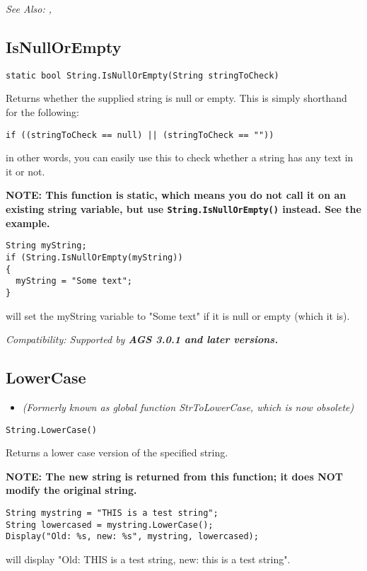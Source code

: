 \it{See Also:} ,


\subsection{IsNullOrEmpty}\label{String.IsNullOrEmpty}%

\begin{verbatim}
static bool String.IsNullOrEmpty(String stringToCheck)
\end{verbatim}
Returns whether the supplied string is null or empty. This is simply shorthand for the following:
\begin{verbatim}
if ((stringToCheck == null) || (stringToCheck == ""))
\end{verbatim}
in other words, you can easily use this to check whether a string has any text in it or not.

\bf{NOTE:} This function is static, which means you do not call it on an existing
string variable, but use \verb$String.IsNullOrEmpty()$ instead. See the example.

\begin{verbatim}
String myString;
if (String.IsNullOrEmpty(myString))
{
  myString = "Some text";
}
\end{verbatim}
will set the myString variable to "Some text" if it is null or empty (which it is).

\it{Compatibility:} Supported by \bf{AGS 3.0.1} and later versions.


\subsection{LowerCase}\label{String.LowerCase}%

\begin{itemize}
\item \it{(Formerly known as global function StrToLowerCase, which is now obsolete)}
\end{itemize}

\begin{verbatim}
String.LowerCase()
\end{verbatim}
Returns a lower case version of the specified string.

\bf{NOTE:} The new string is returned from this function; it
does \bf{NOT} modify the original string.

\begin{verbatim}
String mystring = "THIS is a test string";
String lowercased = mystring.LowerCase();
Display("Old: %s, new: %s", mystring, lowercased);
\end{verbatim}
will display "Old: THIS is a test string, new: this is a test string".

